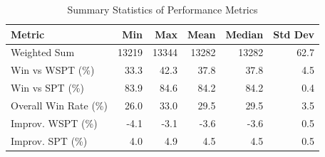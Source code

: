 \begin{table}[htbp]%
\centering%
\begin{tabular}{lrrrrr}%
\toprule%
\textbf{Metric}&\textbf{Min}&\textbf{Max}&\textbf{Mean}&\textbf{Median}&\textbf{Std Dev}\\%
\midrule%
Weighted Sum&13219&13344&13282&13282&62.7\\%
Win vs WSPT (\%)&33.3&42.3&37.8&37.8&4.5\\%
Win vs SPT (\%)&83.9&84.6&84.2&84.2&0.4\\%
Overall Win Rate (\%)&26.0&33.0&29.5&29.5&3.5\\%
Improv. WSPT (\%)&-4.1&-3.1&-3.6&-3.6&0.5\\%
Improv. SPT (\%)&4.0&4.9&4.5&4.5&0.5\\%
\bottomrule%
\end{tabular}%
\caption{Summary Statistics of Performance Metrics}%
\label{tab:metrics}%
\end{table}